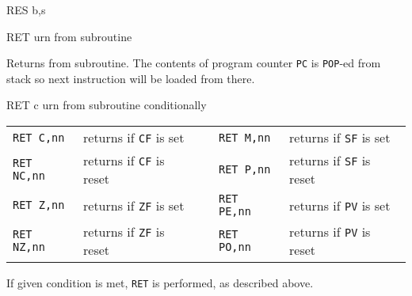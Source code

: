 \begin{basedescript}{
    \desclabelstyle{\multilinelabel}
    \desclabelwidth{3cm}}
\begin{DetailItem}{RES b,s}
        \begin{DetailTiming}
        \end{DetailTiming}

    \end{DetailItem}

    \pagebreak
    \begin{DetailItem}{RET}
        {urn from subroutine}
        {\SymRET}

        Returns from subroutine. The contents of program counter {\tt PC} is {\tt POP}-ed from stack so next instruction will be loaded from there.

        \begin{DetailEffects}
            \FlagsRET
        \end{DetailEffects}
				
        \begin{DetailTiming}
        \end{DetailTiming}

    \end{DetailItem}

    \begin{DetailItem}{RET c}
        {urn from subroutine conditionally}
        {}

        \vspace{1ex} %
        \begin{tabular}{@{}llcll}
            {\tt RET C,nn} & returns if {\tt CF} is set & & 
                {\tt RET M,nn} & returns if {\tt SF} is set\\
            {\tt RET NC,nn} & returns if {\tt CF} is reset & & 
                {\tt RET P,nn} & returns if {\tt SF} is reset\\
            {\tt RET Z,nn} & returns if {\tt ZF} is set & & 
                {\tt RET PE,nn} & returns if {\tt PV} is set\\
            {\tt RET NZ,nn} & returns if {\tt ZF} is reset & & 
                {\tt RET PO,nn} & returns if {\tt PV} is reset\\
        \end{tabular}

        If given condition is met, {\tt RET} is performed, as described above.

        \begin{DetailEffects}
            \FlagsRETcc
        \end{DetailEffects}
						

\end{DetailItem}
\end{basedescript}
